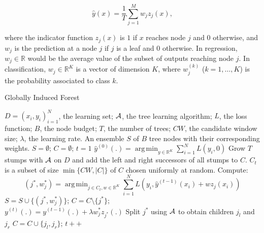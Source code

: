 \documentclass{article}
\DeclareMathOperator*{\argmin}{arg\,min}
\begin{document}
\vspace*{-\baselineskip}
\begin{equation}\label{eq:fs}
\hat{y}(x) =  \frac{1}{T} \sum_{j=1}^{M} w_j z_j(x),
\end{equation}

where the indicator function $z_j(x)$ is $1$ if $x$ reaches node $j$
and $0$ otherwise, and $w_j$ is the prediction at a node $j$ if $j$ is
a leaf and $0$ otherwise. In regression, $w_j \in \mathbb{R}$ would be the 
average value of the subset of outputs reaching node $j$. In classification, 
$w_j \in \mathbb{R}^K$ is a vector of dimension $K$, where $w_j^{(k)}$ 
($k=1,\ldots,K$) is the probability associated to class $k$.



\begin{algorithm}[tb]
   \caption{Globally Induced Forest}
   \label{alg:gif}
\begin{algorithmic}[1]
     $D= (x_i,y_i)_{i=1}^N$, the learning set; ${\cal 
    A}$, the tree learning algorithm; $L$, the loss function;  $B$, the node 
    budget; $T$, the number of trees; $CW$, the candidate window size; 
    $\lambda$, the learning rate.
     An ensemble $S$ of $B$ tree nodes with their 
    corresponding weights.
    \STATE $S=\emptyset$; $C=\emptyset$; $t=1$
    \STATE $\hat{y}^{(0)}(.)= \argmin_{y \in \mathbb{R}^K} \sum_{i=1}^{N} 
    L(y_i, 0)$
    \STATE Grow $T$ stumps with ${\cal A}$ on $D$ and add the left and right 
    successors of all stumps to  $C$.    
    \REPEAT
        \STATE $C_t$ is a subset of size $\min\{CW, |C|\}$ of $C$ chosen 
        uniformly at random.
        \STATE Compute:
            \vspace{-1.5em}
            \begin{equation*}
            (j^*,w^*_j)=\argmin_{j\in C_t, w\in \mathbb{R}^K} 
            \sum_{i=1}^{N} L \left(y_i, \hat{y}^{(t-1)}(x_i) + w z_j(x_i) 
            \right)
            \end{equation*}
            \vspace{-1em}
        \STATE $S=S\cup\{(j^*,w^*_j)\}$; $C=C\setminus\{j^*\}$; \\
            $y^{(t)}(.)=y^{(t-1)}(.)+\lambda w^*_j z_{j^*}(.)$
        \STATE Split $j^*$ using ${\cal A}$ to obtain children $j_l$ and $j_r$
        \STATE $C=C\cup\{j_l,j_r\}$; $t++$
\end{algorithmic}
\end{algorithm}
\end{document}
